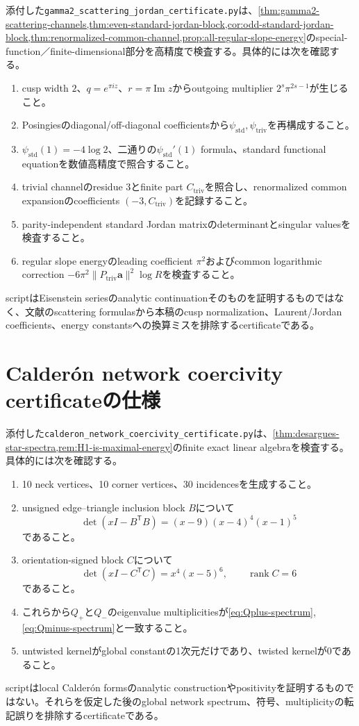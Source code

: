 \documentclass[11pt,a4paper]{ltjsarticle}
\theoremstyle{definition}
\theoremstyle{remark}
\begin{document}
添付した\texttt{gamma2\_scattering\_jordan\_certificate.py}は、\cref{thm:gamma2-scattering-channels,thm:even-standard-jordan-block,cor:odd-standard-jordan-block,thm:renormalized-common-channel,prop:all-regular-slope-energy}のspecial-function／finite-dimensional部分を高精度で検査する。具体的には次を確認する。
\begin{enumerate}[leftmargin=2.5em]
\item cusp width $2$、$q=e^{\pi iz}$、$r=\pi\operatorname{Im}z$からoutgoing multiplier $2^s\pi^{2s-1}$が生じること。
\item Posingiesのdiagonal/off-diagonal coefficientsから$\psi_{\mathrm{std}},\psi_{\mathrm{triv}}$を再構成すること。
\item $\psi_{\mathrm{std}}(1)=-4\log2$、二通りの$\psi_{\mathrm{std}}'(1)$ formula、standard functional equationを数値高精度で照合すること。
\item trivial channelのresidue $3$とfinite part $C_{\mathrm{triv}}$を照合し、renormalized common expansionのcoefficients $(-3,C_{\mathrm{triv}})$を記録すること。
\item parity-independent standard Jordan matrixのdeterminantとsingular valuesを検査すること。
\item regular slope energyのleading coefficient $\pi^2$およびcommon logarithmic correction $-6\pi^2\|P_{\mathrm{triv}}\mathbf a\|^2\log R$を検査すること。
\end{enumerate}
scriptはEisenstein seriesのanalytic continuationそのものを証明するものではなく、文献のscattering formulasから本稿のcusp normalization、Laurent/Jordan coefficients、energy constantsへの換算ミスを排除するcertificateである。

\section{Calder\'on network coercivity certificateの仕様}

添付した\texttt{calderon\_network\_coercivity\_certificate.py}は、\cref{thm:desargues-star-spectra,rem:H1-is-maximal-energy}のfinite exact linear algebraを検査する。具体的には次を確認する。
\begin{enumerate}[leftmargin=2.5em]
\item 10 neck vertices、10 corner vertices、30 incidencesを生成すること。
\item unsigned edge--triangle inclusion block $B$について
\[
 \det(xI-B^{\mathsf T}B)=(x-9)(x-4)^4(x-1)^5
\]
であること。
\item orientation-signed block $C$について
\[
 \det(xI-C^{\mathsf T}C)=x^4(x-5)^6,
 \qquad \operatorname{rank}C=6
\]
であること。
\item これらから$Q_+$と$Q_-$のeigenvalue multiplicitiesが\eqref{eq:Qplus-spectrum}, \eqref{eq:Qminus-spectrum}と一致すること。
\item untwisted kernelがglobal constantの1次元だけであり、twisted kernelが0であること。
\end{enumerate}
scriptはlocal Calder\'on formsのanalytic constructionやpositivityを証明するものではない。それらを仮定した後のglobal network spectrum、符号、multiplicityの転記誤りを排除するcertificateである。
\end{document}
